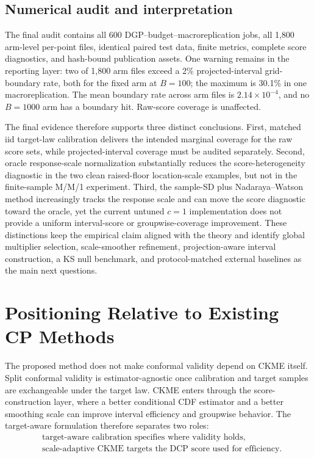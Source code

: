 \documentclass[11pt]{article}
\begin{document}
\subsection{Numerical audit and interpretation}

The final audit contains all 600 DGP--budget--macroreplication jobs, all 1,800 arm-level per-point files, identical paired test data, finite metrics, complete score diagnostics, and hash-bound publication assets. One warning remains in the reporting layer: two of 1,800 arm files exceed a 2\% projected-interval grid-boundary rate, both for the fixed arm at \(B=100\); the maximum is 30.1\% in one macroreplication. The mean boundary rate across arm files is \(2.14\times10^{-4}\), and no \(B=1000\) arm has a boundary hit. Raw-score coverage is unaffected.

The final evidence therefore supports three distinct conclusions. First, matched iid target-law calibration delivers the intended marginal coverage for the raw score sets, while projected-interval coverage must be audited separately. Second, oracle response-scale normalization substantially reduces the score-heterogeneity diagnostic in the two clean raised-floor location-scale examples, but not in the finite-sample M/M/1 experiment. Third, the sample-SD plus Nadaraya--Watson method increasingly tracks the response scale and can move the score diagnostic toward the oracle, yet the current untuned \(c=1\) implementation does not provide a uniform interval-score or groupwise-coverage improvement. These distinctions keep the empirical claim aligned with the theory and identify global multiplier selection, scale-smoother refinement, projection-aware interval construction, a KS null benchmark, and protocol-matched external baselines as the main next questions.

\fi

\section{Positioning Relative to Existing CP Methods}
\label{sec:positioning}

The proposed method does not make conformal validity depend on CKME itself. Split conformal validity is estimator-agnostic once calibration and target samples are exchangeable under the target law. CKME enters through the score-construction layer, where a better conditional CDF estimator and a better smoothing scale can improve interval efficiency and groupwise behavior. The target-aware formulation therefore separates two roles:
\[
  \begin{aligned}
  &\text{target-aware calibration specifies where validity holds,}\\
  &\text{scale-adaptive CKME targets the DCP score used for efficiency.}
  \end{aligned}
\]
\end{document}
